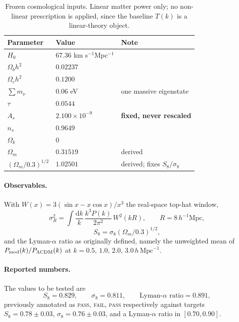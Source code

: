\documentclass[11pt,a4paper]{article}
\newcommand{\hMpc}{h\,\mathrm{Mpc}^{-1}}
\newcommand{\LCDM}{\Lambda\mathrm{CDM}}
\begin{document}
\begin{table}[htb]
\centering
\small
\begin{tabular}{lll}
\toprule
Parameter & Value & Note\\
\midrule
$H_0$        & $67.36$ km s$^{-1}$Mpc$^{-1}$ & \\
$\Omega_b h^2$ & $0.02237$ & \\
$\Omega_c h^2$ & $0.1200$  & \\
$\sum m_\nu$ & $0.06$ eV & one massive eigenstate\\
$\tau$       & $0.0544$  & \\
$A_s$        & $2.100\times10^{-9}$ & \textbf{fixed, never rescaled}\\
$n_s$        & $0.9649$  & \\
$\Omega_k$   & $0$       & \\
\midrule
$\Omega_m$   & $0.31519$ & derived\\
$(\Omega_m/0.3)^{1/2}$ & $1.02501$ & derived; fixes $S_8/\sigma_8$\\
\bottomrule
\end{tabular}
\caption{Frozen cosmological inputs. Linear matter power only; no non-linear
prescription is applied, since the baseline $T(k)$ is a linear-theory object.}
\label{tab:cosmo}
\end{table}

\paragraph{Observables.} With $W(x)=3(\sin x-x\cos x)/x^3$ the real-space top-hat
window,
\begin{equation}
\sigma_R^2=\int\frac{\mathrm{d}k}{k}\,\frac{k^3P(k)}{2\pi^2}\,W^2(kR),
\qquad R=8\,h^{-1}\mathrm{Mpc},
\label{eq:sigma8}
\end{equation}
\begin{equation}
S_8=\sigma_8\left(\Omega_m/0.3\right)^{1/2},
\label{eq:S8}
\end{equation}
and the Lyman-$\alpha$ ratio as originally defined, namely the unweighted mean of
$P_{\rm mod}(k)/P_{\LCDM}(k)$ at $k=0.5,\,1.0,\,2.0,\,3.0\,\hMpc$.

\paragraph{Reported numbers.} The values to be tested are
\begin{equation}
S_8=0.829,\qquad \sigma_8=0.811,\qquad
\text{Lyman-}\alpha\text{ ratio}=0.891,
\end{equation}
previously annotated as \textsc{pass}, \textsc{fail}, \textsc{pass} respectively
against targets $S_8=0.78\pm0.03$, $\sigma_8=0.76\pm0.03$, and a Lyman-$\alpha$
ratio in $[0.70,0.90]$.
\end{document}
